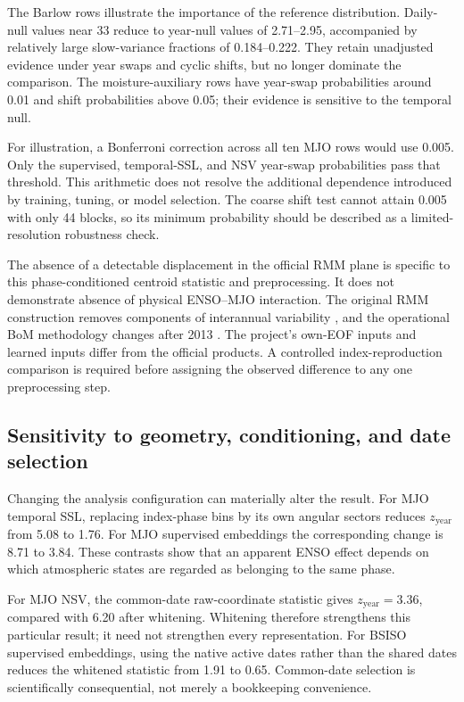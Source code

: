 \documentclass[11pt]{article}
\begin{document}
The Barlow rows illustrate the importance of the reference distribution. Daily-null values near 33 reduce to year-null values of 2.71--2.95, accompanied by relatively large slow-variance fractions of 0.184--0.222. They retain unadjusted evidence under year swaps and cyclic shifts, but no longer dominate the comparison. The moisture-auxiliary rows have year-swap probabilities around 0.01 and shift probabilities above 0.05; their evidence is sensitive to the temporal null.

For illustration, a Bonferroni correction across all ten MJO rows would use 0.005. Only the supervised, temporal-SSL, and NSV year-swap probabilities pass that threshold. This arithmetic does not resolve the additional dependence introduced by training, tuning, or model selection. The coarse shift test cannot attain 0.005 with only 44 blocks, so its minimum probability should be described as a limited-resolution robustness check.

The absence of a detectable displacement in the official RMM plane is specific to this phase-conditioned centroid statistic and preprocessing. It does not demonstrate absence of physical ENSO--MJO interaction. The original RMM construction removes components of interannual variability \cite{wheeler2004}, and the operational BoM methodology changes after 2013 \cite{bom}. The project's own-EOF inputs and learned inputs differ from the official products. A controlled index-reproduction comparison is required before assigning the observed difference to any one preprocessing step.

\subsection{Sensitivity to geometry, conditioning, and date selection}

Changing the analysis configuration can materially alter the result. For MJO temporal SSL, replacing index-phase bins by its own angular sectors reduces $z_{\mathrm{year}}$ from 5.08 to 1.76. For MJO supervised embeddings the corresponding change is 8.71 to 3.84. These contrasts show that an apparent ENSO effect depends on which atmospheric states are regarded as belonging to the same phase.

For MJO NSV, the common-date raw-coordinate statistic gives $z_{\mathrm{year}}=3.36$, compared with 6.20 after whitening. Whitening therefore strengthens this particular result; it need not strengthen every representation. For BSISO supervised embeddings, using the native active dates rather than the shared dates reduces the whitened statistic from 1.91 to 0.65. Common-date selection is scientifically consequential, not merely a bookkeeping convenience.
\end{document}
